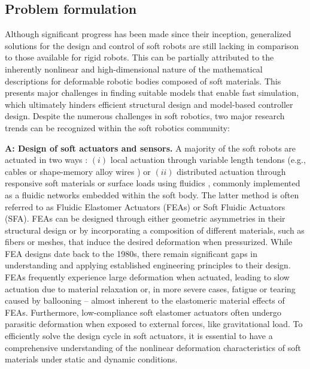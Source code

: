 \subsection{Problem formulation}
Although significant progress has been made since their inception, generalized solutions for the design and control of soft robots are still lacking in comparison to those available for rigid robots. This can be partially attributed to the inherently nonlinear and high-dimensional nature of the mathematical descriptions for deformable robotic bodies composed of soft materials. This presents major challenges in finding suitable models that enable fast simulation, which ultimately hinders efficient structural design and model-based controller design. Despite the numerous challenges in soft robotics, two major research trends can be recognized within the soft robotics community:

\textbf{A: Design of soft actuators and sensors.} A majority of the soft robots are actuated in two ways \cite{Rus2015}: $(i)$ local actuation through variable length tendons (e.g., cables \cite{Renda2018} or shape-memory alloy wires \cite{An2023Jan}) or $(ii)$ distributed actuation through responsive soft materials \cite{Vantomme2021} or surface loads using fluidics \cite{Fras2018Oct,Hawkes2017,Falkenhahn2015}, commonly implemented as a fluidic networks embedded within the soft body. The latter method is often referred to as Fluidic Elastomer Actuators (FEAs) or Soft Fluidic Actuators (SFA). FEAs can be designed through either geometric asymmetries in their structural design or by incorporating a composition of different materials, such as fibers or meshes, that induce the desired deformation when pressurized. While FEA designs date back to the 1980s, there remain significant gaps in understanding and applying established engineering principles to their design. FEAs frequently experience large deformation when actuated, leading to slow actuation due to material relaxation or, in more severe cases, fatigue or tearing caused by ballooning \cite{Marchese2015} -- almost inherent to the elastomeric material effects of FEAs. Furthermore, low-compliance soft elastomer actuators often undergo parasitic deformation when exposed to external forces, like gravitational load. To efficiently solve the design cycle in soft actuators, it is essential to have a comprehensive understanding of the nonlinear deformation characteristics of soft materials under static and dynamic conditions.

